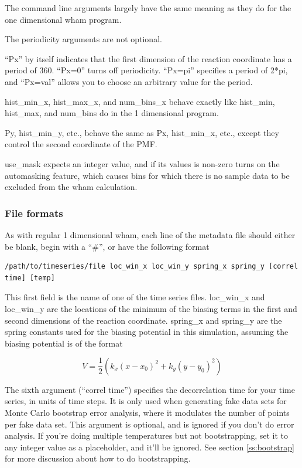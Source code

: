 \documentclass[12pt]{article}
\begin{document}
The command line arguments largely have the same meaning as they do for the
one dimensional wham program.

The periodicity arguments are not optional.

``Px'' by itself indicates that the first dimension of the reaction coordinate
has a period of 360.  ``Px=0'' turns off periodicity.  ``Px=pi'' specifies a
period of 2*pi, and ``Px=val'' allows you to choose an arbitrary value for
the period.

hist\_min\_x, hist\_max\_x, and num\_bins\_x behave exactly like hist\_min,
hist\_max, and num\_bins do in the 1 dimensional program.

Py, hist\_min\_y, etc., behave the same as Px, hist\_min\_x, etc., except they
control the second coordinate of the PMF.

use\_mask expects an integer value, and if its values is non-zero turns on
the automasking feature, which causes bins for which there is no sample data
to be excluded from the wham calculation.

\subsubsection{File formats}

As with regular 1 dimensional wham, each line of the metadata file should
either be blank, begin with a ``\#'', or have the following format

\begin{footnotesize}
\begin{verbatim}
/path/to/timeseries/file loc_win_x loc_win_y spring_x spring_y [correl time] [temp]
\end{verbatim}
\end{footnotesize}

This first field is the name of one of the time series files.  loc\_win\_x
and loc\_win\_y are the locations of the minimum of the biasing terms in the
first and second dimensions of the reaction coordinate.  spring\_x and
spring\_y are the spring constants used for the biasing potential in this
simulation, assuming the biasing potential is of the format

\begin{equation}
V = \frac{1}{2} ( k_x (x - x_0)^2 + k_y (y -y_0)^2 )
\end{equation}

The sixth argument (``correl time'') specifies the decorrelation time for
your time series, in units of time steps.  It is only used when generating
fake data sets for Monte Carlo bootstrap error analysis, where it modulates
the number of points per fake data set.  This argument is optional, and is
ignored if you don't do error analysis.  If you're doing multiple
temperatures but not bootstrapping, set it to any integer value as a
placeholder, and it'll be ignored.  See section \ref{ss:bootstrap} for more
discussion about how to do bootstrapping.
\end{document}
